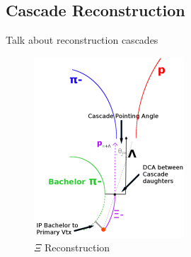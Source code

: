 \documentclass[../AnalysisNoteJBuxton.tex]{subfiles}
\begin{document}
\subsection{Cascade Reconstruction}
\label{CascadeReconstruction}

Talk about reconstruction cascades

\begin{figure}[h]
  \centering
  \includegraphics[width=0.5\textwidth]{3_DataSelection/Figures/XiCuts.pdf}
  \caption[$\Xi$ Reconstruction]{$\Xi$ Reconstruction}
  \label{fig:XiReconstruction}
\end{figure}
\end{document}
